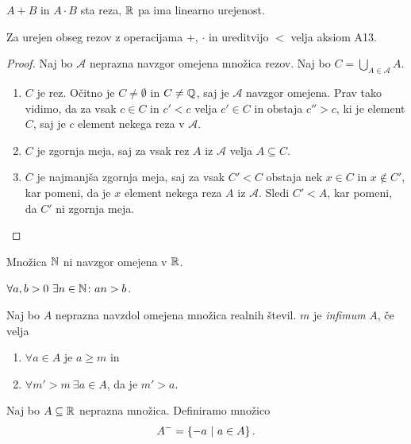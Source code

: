 \documentclass[12pt, a4paper]{article}
\begin{document}
\begin{opomba}
$A+B$ in $A\cdot B$ sta reza, $\mathbb{R}$ pa ima linearno urejenost.
\end{opomba}

\begin{izrek}
Za urejen obseg rezov z operacijama $+$, $\cdot$ in ureditvijo $<$ velja aksiom A13.
\end{izrek}

\begin{proof}
Naj bo $\mathcal{A}$ neprazna navzgor omejena množica rezov. Naj bo $\displaystyle C=\bigcup_{A\in\mathcal{A}}A.$

\begin{enumerate}[label=\roman*)]
\item $C$ je rez. Očitno je $C\ne \emptyset$ in $C\ne\mathbb{Q}$, saj je $\mathcal{A}$ navzgor omejena. Prav tako vidimo, da za vsak $c\in C$ in $c'<c$ velja $c'\in C$ in obstaja  $c''>c$, ki je element $C$, saj je $c$ element nekega reza v $\mathcal{A}$.
\item $C$ je zgornja meja, saj za vsak rez $A$ iz $\mathcal{A}$  velja $A\subseteq C$.
\item $C$ je najmanjša zgornja meja, saj za vsak $C'<C$ obstaja nek $x\in C$ in $x\not\in C'$, kar pomeni, da je $x$ element nekega reza $A$ iz $\mathcal{A}$. Sledi $C'<A$, kar pomeni, da $C'$ ni zgornja meja.\qedhere
\end{enumerate}
\end{proof}

\begin{posledica}
Množica $\mathbb{N}$ ni navzgor omejena v $\mathbb{R}$.
\end{posledica}

\begin{trditev}
$\forall a,b>0~\exists n\in\mathbb{N}\colon an>b$.
\end{trditev}

\begin{definicija}
Naj bo $A$ neprazna navzdol omejena množica realnih števil. $m$ je \emph{infimum} $A$, če velja

\begin{enumerate}[label=\roman*)]
\item $\forall a\in A$ je $a\geq m$ in
\item $\forall m'>m~\exists a\in A$, da je $m'>a$.
\end{enumerate}
\end{definicija}

\begin{definicija}
Naj bo $A\subseteq\mathbb{R}$ neprazna množica. Definiramo množico
\[
A^-=\left\{-a~\middle\vert~a\in A\right\}.
\]
\end{definicija}
\end{document}
